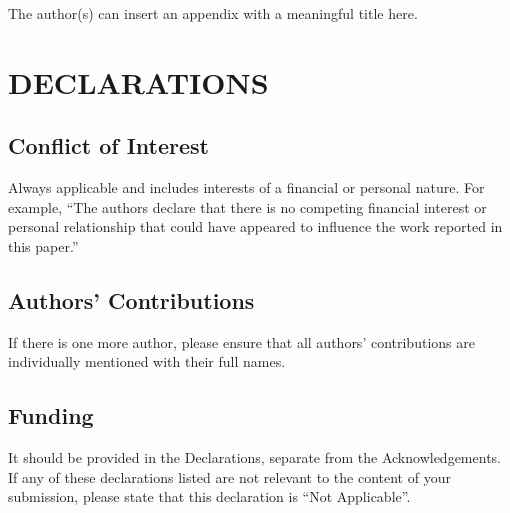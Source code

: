 \documentclass{IJCAS}
\begin{document}
\appendix

The author(s) can insert an appendix with a meaningful title here.



\section*{DECLARATIONS}

\subsection*{Conflict of Interest}
Always applicable and includes interests of a financial or personal nature. For example, ``The authors declare that there is no competing financial interest or personal relationship that could have appeared to influence the work reported in this paper.''

\subsection*{Authors' Contributions}
If there is one more author, please ensure that all authors' contributions are individually mentioned with their full names.

\subsection*{Funding }
It should be provided in the Declarations, separate from the Acknowledgements. If any of these declarations listed are not relevant to the content of your submission, please state that this declaration is ``Not Applicable''.







\end{document}
